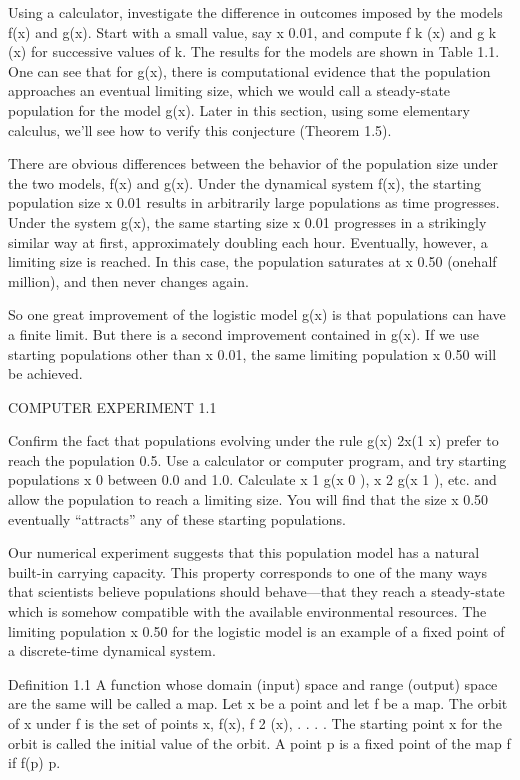\documentclass[12pt]{article}
\begin{document}
Using a calculator, investigate the difference in outcomes imposed by the models f(x) and g(x). Start with 
a small value, say x  0.01, and compute f k (x) and g k (x) for successive values of k. The results for the 
models are shown in Table 1.1. One can see that for g(x), there is computational evidence that the 
population approaches an eventual limiting size, which we would call a steady-state population for the 
model g(x). Later in this section, using some elementary calculus, we’ll see how to verify this conjecture 
(Theorem 1.5).

There are obvious differences between the behavior of the population size under the two models, f(x) and 
g(x). Under the dynamical system f(x), the starting population size x  0.01 results in arbitrarily large 
populations as time progresses. Under the system g(x), the same starting size x  0.01 progresses in a 
strikingly similar way at first, approximately doubling each hour. Eventually, however, a limiting size is 
reached. In this case, the population saturates at x  0.50 (onehalf million), and then never changes again.

So one great improvement of the logistic model g(x) is that populations can have a finite limit. But there 
is a second improvement contained in g(x). If we use starting populations other than x  0.01, the same 
limiting population x  0.50 will be achieved.

COMPUTER EXPERIMENT 1.1

Confirm the fact that populations evolving under the rule g(x)  2x(1  x) prefer to reach the population 
0.5. Use a calculator or computer program, and try starting populations x 0 between 0.0 and 1.0. Calculate 
x 1  g(x 0 ), x 2  g(x 1 ), etc. and allow the population to reach a limiting size. You will find that the 
size x  0.50 eventually “attracts” any of these starting populations.

Our numerical experiment suggests that this population model has a natural built-in carrying capacity. This 
property corresponds to one of the many ways that scientists believe populations should behave—that they 
reach a steady-state which is somehow compatible with the available environmental resources. The limiting 
population x  0.50 for the logistic model is an example of a fixed point of a discrete-time dynamical 
system.

Definition 1.1 A function whose domain (input) space and range (output) space are the same will be called a 
map. Let x be a point and let f be a map. The orbit of x under f is the set of points x, f(x), f 2 (x), . . 
.  . The starting point x for the orbit is called the initial value of the orbit. A point p is a fixed 
point of the map f if f(p)  p.
\end{document}
